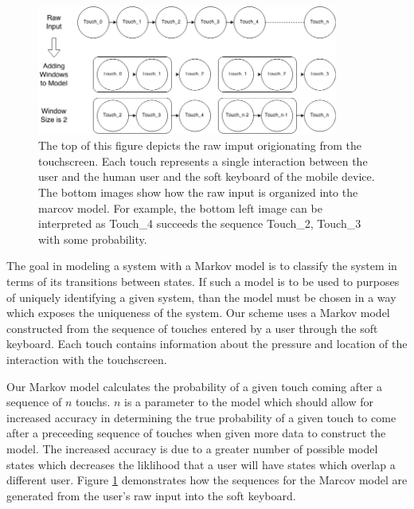 \documentclass{acm_proc_article-sp}
\begin{document}
\begin{figure}
\centering
\includegraphics[width=3.9in]{marcov_model_building.png}
\caption{The top of this figure depicts the raw imput origionating from the touchscreen. Each touch represents a single interaction between the user and the human user and the soft keyboard of the mobile device. The bottom images show how the raw input is organized into the marcov model. For example, the bottom left image can be interpreted as Touch\_4 succeeds the sequence Touch\_2, Touch\_3 with some probability.}
\label{fig:markov_model_building}
\end{figure}


The goal in modeling a system with a Markov model is to classify the system in terms of its transitions between states. If such a model is to be used to purposes of uniquely identifying a given system, than the model must be chosen in a way which exposes the uniqueness of the system. Our scheme uses a Markov model constructed from the sequence of touches entered by a user through the soft keyboard.
Each touch contains information about the pressure and location of the interaction with the touchscreen.

Our Markov model calculates the probability of a given touch coming after a sequence of $n$ touchs.
$n$ is a parameter to the model which should allow for increased accuracy in determining the true probability of a given touch to come after a preceeding sequence of touches when given more data to construct the model. The increased accuracy is due to a greater number of possible model states which decreases the liklihood that a user will have states which overlap a different user.
Figure \ref{fig:markov_model_building} demonstrates how the sequences for the Marcov model are generated from the user's raw input into the soft keyboard.
\end{document}

